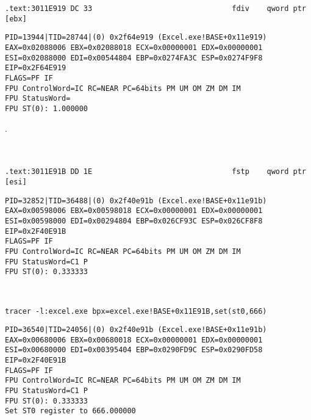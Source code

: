 \begin{lstlisting}
.text:3011E919 DC 33                                fdiv    qword ptr [ebx]
\end{lstlisting}

\begin{lstlisting}
PID=13944|TID=28744|(0) 0x2f64e919 (Excel.exe!BASE+0x11e919)
EAX=0x02088006 EBX=0x02088018 ECX=0x00000001 EDX=0x00000001
ESI=0x02088000 EDI=0x00544804 EBP=0x0274FA3C ESP=0x0274F9F8
EIP=0x2F64E919
FLAGS=PF IF
FPU ControlWord=IC RC=NEAR PC=64bits PM UM OM ZM DM IM 
FPU StatusWord=
FPU ST(0): 1.000000
\end{lstlisting}

 \TT{[EBX]}.\\
\\
\\

\begin{lstlisting}
.text:3011E91B DD 1E                                fstp    qword ptr [esi]
\end{lstlisting}


\begin{lstlisting}
PID=32852|TID=36488|(0) 0x2f40e91b (Excel.exe!BASE+0x11e91b)
EAX=0x00598006 EBX=0x00598018 ECX=0x00000001 EDX=0x00000001
ESI=0x00598000 EDI=0x00294804 EBP=0x026CF93C ESP=0x026CF8F8
EIP=0x2F40E91B
FLAGS=PF IF
FPU ControlWord=IC RC=NEAR PC=64bits PM UM OM ZM DM IM 
FPU StatusWord=C1 P 
FPU ST(0): 0.333333
\end{lstlisting}

\PTBRph{}\ESph{}\PLph{}\ITAph{}\\

\begin{lstlisting}
tracer -l:excel.exe bpx=excel.exe!BASE+0x11E91B,set(st0,666)
\end{lstlisting}

\begin{lstlisting}
PID=36540|TID=24056|(0) 0x2f40e91b (Excel.exe!BASE+0x11e91b)
EAX=0x00680006 EBX=0x00680018 ECX=0x00000001 EDX=0x00000001
ESI=0x00680000 EDI=0x00395404 EBP=0x0290FD9C ESP=0x0290FD58
EIP=0x2F40E91B
FLAGS=PF IF
FPU ControlWord=IC RC=NEAR PC=64bits PM UM OM ZM DM IM 
FPU StatusWord=C1 P 
FPU ST(0): 0.333333
Set ST0 register to 666.000000
\end{lstlisting}

